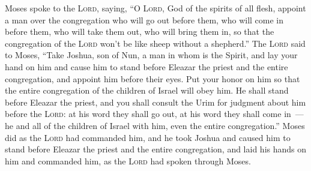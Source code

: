 \begin{inparaenum}
   Moses spoke to the \textsc{Lord}, saying,%
   ``O \textsc{Lord}, God of the spirits of all flesh, appoint a man over the congregation%
   who will go out before them, who will come in before them, who will take them out, who will bring them in, so that the congregation of the \textsc{Lord} won't be like sheep without a shepherd.''%
   The \textsc{Lord} said to Moses, ``Take Joshua, son of Nun, a man in whom is the Spirit, and lay your hand on him%
   and cause him to stand before Eleazar the priest and the entire congregation, and appoint him before their eyes.%
   Put your honor on him so that the entire congregation of the children of Israel will obey him.%
   He shall stand before Eleazar the priest, and you shall consult the Urim for judgment about him before the \textsc{Lord}: at his word they shall go out, at his word they shall come in~--- he and all of the children of Israel with him, even the entire congregation.''%
   Moses did as the \textsc{Lord} had commanded him, and he took Joshua and caused him to stand before Eleazar the priest and the entire congregation,%
   and laid his hands on him and commanded him, as the \textsc{Lord} had spoken through Moses.%
\end{inparaenum}
